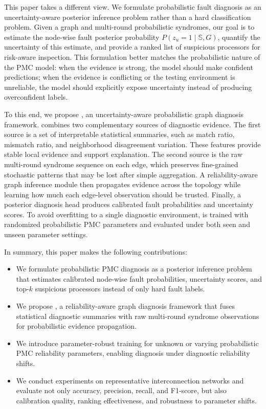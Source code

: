 This paper takes a different view. We formulate probabilistic fault diagnosis as an uncertainty-aware posterior inference problem rather than a hard classification problem. Given a graph and multi-round probabilistic syndromes, our goal is to estimate the node-wise fault posterior probability $P(z_u=1\mid \mathbb{S},G)$, quantify the uncertainty of this estimate, and provide a ranked list of suspicious processors for risk-aware inspection. This formulation better matches the probabilistic nature of the PMC model: when the evidence is strong, the model should make confident predictions; when the evidence is conflicting or the testing environment is unreliable, the model should explicitly expose uncertainty instead of producing overconfident labels.

To this end, we propose \tool, an uncertainty-aware probabilistic graph diagnosis framework. \tool combines two complementary sources of diagnostic evidence. The first source is a set of interpretable statistical summaries, such as match ratio, mismatch ratio, and neighborhood disagreement variation. These features provide stable local evidence and support explanation. The second source is the raw multi-round syndrome sequence on each edge, which preserves fine-grained stochastic patterns that may be lost after simple aggregation. A reliability-aware graph inference module then propagates evidence across the topology while learning how much each edge-level observation should be trusted. Finally, a posterior diagnosis head produces calibrated fault probabilities and uncertainty scores. To avoid overfitting to a single diagnostic environment, \tool is trained with randomized probabilistic PMC parameters and evaluated under both seen and unseen parameter settings.

In summary, this paper makes the following contributions:
\begin{itemize}[leftmargin=*, itemsep=1pt, parsep=0pt, topsep=1pt]
    \item We formulate probabilistic PMC diagnosis as a posterior inference problem that estimates calibrated node-wise fault probabilities, uncertainty scores, and top-$k$ suspicious processors instead of only hard fault labels.
    \item We propose \tool, a reliability-aware graph diagnosis framework that fuses statistical diagnostic summaries with raw multi-round syndrome observations for probabilistic evidence propagation.
    \item We introduce parameter-robust training for unknown or varying probabilistic PMC reliability parameters, enabling diagnosis under diagnostic reliability shifts.
    \item We conduct experiments on representative interconnection networks and evaluate not only accuracy, precision, recall, and F1-score, but also calibration quality, ranking effectiveness, and robustness to parameter shifts.
\end{itemize}